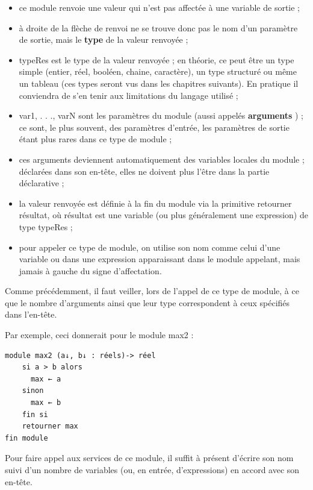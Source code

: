 \documentclass[11pt,a4paper]{article}
\begin{document}
            \par
        
					\begin{itemize}
				
			\item ce module renvoie une valeur qui n'est pas affect\'ee \`a une variable de sortie ;
			\item \`a droite de la fl\`eche de renvoi ne se trouve donc pas le nom d'un param\`etre de sortie,
            mais le \textbf{type} de la valeur renvoy\'ee ;
			\item typeRes est le type de la valeur renvoy\'ee ; en th\'eorie, ce peut \^etre un type simple
            (entier, r\'eel, bool\'een, chaine, caract\`ere), un type structur\'e ou m\^eme un tableau (ces
            types seront vus dans les chapitres suivants). En pratique il conviendra de s'en tenir
            aux limitations du langage utilis\'e ;
			\item var1, . . ., varN sont les param\`etres du module 
            (aussi appel\'es \textbf{arguments} ) ; ce sont, le
            plus souvent, des param\`etres d'entr\'ee, les param\`etres de sortie \'etant plus rares dans
            ce type de module ;
			\item ces arguments deviennent automatiquement des variables locales du module ; d\'eclar\'ees
            dans son en-t\^ete, elles ne doivent plus l'\^etre dans la partie d\'eclarative ;
			\item la valeur renvoy\'ee est d\'efinie \`a la fin du module via la primitive retourner r\'esultat, o\`u
            r\'esultat est une variable (ou plus g\'en\'eralement une expression) de type typeRes ;
			\item pour appeler ce type de module, on utilise son nom comme celui d'une variable ou
            dans une expression apparaissant dans le module appelant, mais jamais \`a gauche du
            signe d'affectation.
					\end{itemize}
				
            \par
        
          Comme pr\'ec\'edemment, il faut veiller, lors de l'appel de ce type de module, \`a ce que le
          nombre d'arguments ainsi que leur type correspondent \`a ceux sp\'ecifi\'es dans l'en-t\^ete.
        
            \par
        Par exemple, ceci donnerait pour le module max2 : 
            \par
        \begin{verbatim}
module max2 (a↓, b↓ : réels)-> réel
    si a > b alors
      max ← a
    sinon
      max ← b
    fin si
    retourner max
fin module
      \end{verbatim}
        Pour faire appel aux services de ce module, il suffit \`a pr\'esent d'\'ecrire son nom suivi d'un
        nombre de variables (ou, en entr\'ee, d'expressions) en accord avec son en-t\^ete. 
      
\end{document}
